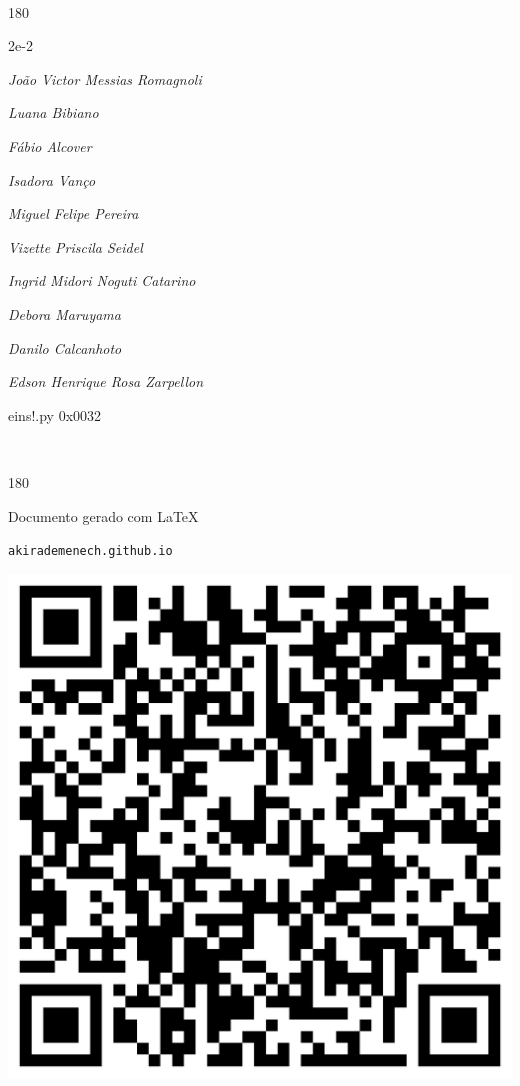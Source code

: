 \documentclass[12pt]{article}
\begin{document}
\pagebreak			

	\ 
	\vfill
	\begin{turn}{180}	
		\begin{minipage}{\textwidth}
		  	\ttfamily %
			\centering
			{\Huge 2e-2}
		  
			\hfill
		  
			

\textit{\small João Victor Messias Romagnoli}

\textit{\small Luana Bibiano}

\textit{\small Fábio Alcover}

\textit{\small Isadora Vanço}

\textit{\small Miguel Felipe Pereira}

\textit{\small Vizette Priscila Seidel}

\textit{\small Ingrid Midori Noguti Catarino}

\textit{\small Debora Maruyama}

\textit{\small Danilo Calcanhoto}

\textit{\small Edson Henrique Rosa Zarpellon}

\bigskip

eins!.py
0x0032


		\end{minipage}	
	\end{turn}
	\vfill
	\

\pagebreak

	\begin{turn}{180}	
		\begin{minipage}{\textwidth}		  
		  Documento gerado com \LaTeX			
		  
		  \texttt{akirademenech.github.io}

		  \includegraphics[height=0.3\textheight]{2e-2.pdf}

		\end{minipage}	
	\end{turn}  
		  
\end{document}
